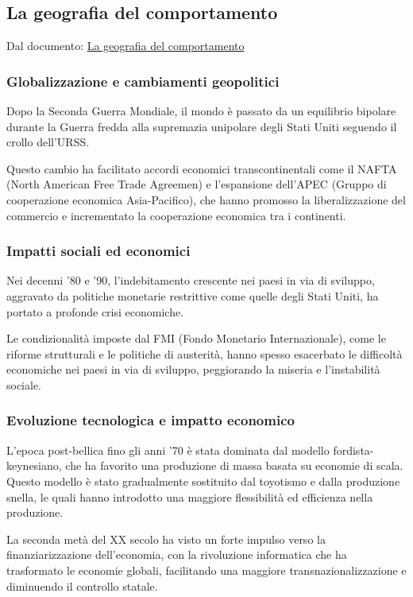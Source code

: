 \documentclass{article}
\begin{document}
\subsection{La geografia del comportamento}
Dal documento: \href{https://github.com/matteofrongillo/passerella/blob/main/Geografia/media/Pass_03a_GlobalizzazioneXX-XXI-A_22-23.pdf?raw=true}{La geografia del comportamento}

\subsubsection{Globalizzazione e cambiamenti geopolitici}
Dopo la Seconda Guerra Mondiale, il mondo è passato da un equilibrio bipolare durante la Guerra
fredda alla supremazia unipolare degli Stati Uniti seguendo il crollo dell'URSS.

Questo cambio ha facilitato accordi economici transcontinentali come il NAFTA (North American Free Trade Agreemen)
e l'espansione dell'APEC (Gruppo di cooperazione economica Asia-Pacifico), che hanno promosso la
liberalizzazione del commercio e incrementato la cooperazione economica tra i continenti.

\subsubsection{Impatti sociali ed economici}
Nei decenni '80 e '90, l'indebitamento crescente nei paesi in via di sviluppo, aggravato da
politiche monetarie restrittive come quelle degli Stati Uniti, ha portato a profonde crisi
economiche.

Le condizionalità imposte dal FMI (Fondo Monetario Internazionale), come le riforme strutturali
e le politiche di austerità, hanno spesso esacerbato le difficoltà economiche nei paesi in via
di sviluppo, peggiorando la miseria e l'instabilità sociale.

\subsubsection{Evoluzione tecnologica e impatto economico}
L'epoca post-bellica fino gli anni '70 è stata dominata dal modello fordista-keynesiano, che ha
favorito una produzione di massa basata su economie di scala. Questo modello è stato
gradualmente sostituito dal toyotismo e dalla produzione snella, le quali hanno introdotto una
maggiore flessibilità ed efficienza nella produzione.

La seconda metà del XX secolo ha visto un forte impulso verso la finanziarizzazione 
dell'economia, con la rivoluzione informatica che ha trasformato le economie globali, facilitando
una maggiore transnazionalizzazione e diminuendo il controllo statale.
\end{document}
